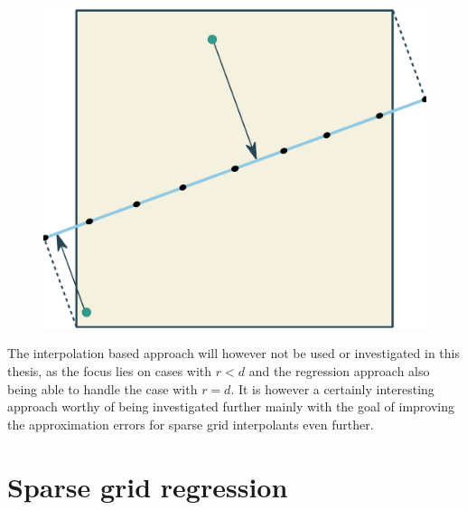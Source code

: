 \documentclass[
  a4paper,  %
  twoside,  %
  bibliography=totoc,
  headsepline,
  cleardoublepage=empty,
  parskip=half,
  draft=false
]{scrbook}
\begin{document}
\begin{mdframed}[style=style]
\begin{figure}[H]
        \centering
\begin{minipage}{.45\textwidth}
        \centering
    \end{minipage}%
    \begin{minipage}{0.55\textwidth}
        \centering
   \includegraphics[width=0.85\linewidth]{graphics/reduced_grid}
\label{fig:reduced_grid}
    \end{minipage}
\end{figure}
\end{mdframed}

The interpolation based approach will however not be used or investigated in this thesis, as the focus lies on cases with $r < d$ and the regression approach also being able to handle the case with $r=d$.
It is however a certainly interesting approach worthy of being investigated further mainly with the goal of improving the approximation errors for sparse grid interpolants even further.

\section{Sparse grid regression}
\end{document}
